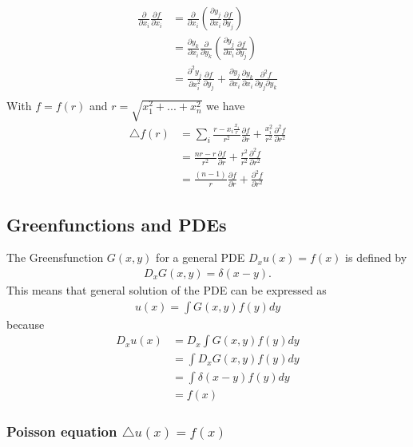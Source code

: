 \documentclass[10pt,a4paper]{article}
\theoremstyle{definition}
\begin{document}
\begin{align}
    \frac{\partial}{\partial x_i}\frac{\partial f}{\partial x_i}
    &=\frac{\partial}{\partial x_i}\left(\frac{\partial y_j}{\partial x_i}\frac{\partial f}{\partial y_j}\right)\\
    &=\frac{\partial y_k}{\partial x_i}\frac{\partial}{\partial y_k}\left(\frac{\partial y_j}{\partial x_i}\frac{\partial f}{\partial y_j}\right)\\
    &=\frac{\partial^2 y_j}{\partial x_i^2}\frac{\partial f}{\partial y_j} + \frac{\partial y_j}{\partial x_i}\frac{\partial y_k}{\partial x_i}\frac{\partial^2 f}{\partial y_j\partial y_k}\\
\end{align}
With $f=f(r)$ and $r=\sqrt{x_1^2+...+x_n^2}$ we have
\begin{align}
    \triangle f(r)
    &=\sum_i \frac{r-x_i \frac{x_i}{r}}{r^2}\frac{\partial f}{\partial r}+\frac{x_i^2}{r^2}\frac{\partial^2 f}{\partial r^2}\\
    &= \frac{nr-r}{r^2}\frac{\partial f}{\partial r}+\frac{r^2}{r^2}\frac{\partial^2 f}{\partial r^2}\\
    &= \frac{(n-1)}{r}\frac{\partial f}{\partial r}+\frac{\partial^2 f}{\partial r^2}
\end{align}



\subsection{Greenfunctions and PDEs}
The Greensfunction $G(x,y)$ for a general PDE $D_x u(x) = f(x)$ is defined by
\begin{align}
    D_x G(x,y) = \delta(x-y).
\end{align}
This means that general solution of the PDE can be expressed as
\begin{align}
    u(x)=\int G(x,y)f(y)dy
\end{align}
because
\begin{align}
    D_x u(x)
    &=D_x \int G(x,y)f(y)dy\\
    &=\int D_x G(x,y)f(y)dy\\
    &=\int \delta(x-y) f(y)dy\\
    &=f(x)
\end{align}

\subsubsection{Poisson equation \texorpdfstring{$\triangle u(x) = f(x)$}{TEXT}}
        
\end{document}
